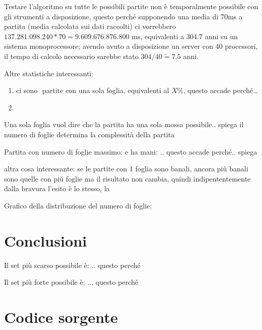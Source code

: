 \documentclass[a4paper.12pt]{report} %
\begin{document}
Testare l'algoritmo su tutte le possibili partite non è temporalmente possibile con gli strumenti a disposizione, questo perché supponendo una media di 70ms a partita (media calcolata sui dati raccolti) ci vorrebbero \(137.281.098.240 * 70  = 9.609.676.876.800\) ms, equivalenti a \(304.7\) anni su un sistema monoprocessore; avendo avuto a disposizione un server con 40 processori, il tempo di calcolo necessario sarebbe stato \(304 / 40 \tilde= 7.5\) anni. 

Altre statistiche interessanti: 
\begin{enumerate}
    \item ci sono \( \) partite con una sola foglia, equivalenti al \( X\%\), questo accade perché\dots
    \item 
\end{enumerate}

Una sola foglia vuol dire che la partita ha una sola mossa possibile.. spiega
il numero di foglie determina la complessità della partita

Partita con numero di foglie massimo:  e ha mani: .. questo accade perché.. spiega

altra cosa interessante: se le partite con 1 foglia sono banali, ancora più banali sono quelle con più foglie ma il risultato non cambia, quindi indipententemente dalla bravura l'esito è lo stesso, la %

Grafico della distribuzione del numero di foglie:



\chapter{Conclusioni}

Il set più scarso possibile è: .. questo perché

Il set più forte possibile è: .., questo perché



\appendix
\chapter{Codice sorgente}

\end{document}
